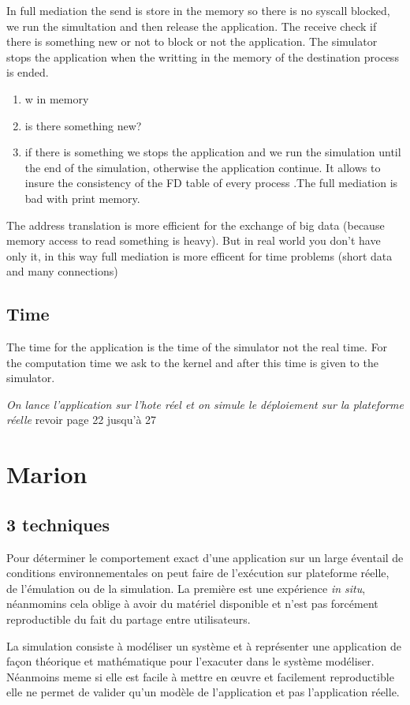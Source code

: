 \documentclass{article}
\begin{document}
In full mediation the send is store in the memory so there is no syscall blocked, we run the simultation and then release the application. The receive check if there is something new or not to block or not the application. The simulator stops the application when the writting in the memory of the destination process is ended.
\begin{enumerate}
\item w in memory
\item is there something new?
\item if there is something we stops the application and we run the simulation until the end of the simulation, otherwise the application continue.
It allows to insure the consistency of the FD table of every process .The full mediation is bad with print memory.
\end{enumerate}

The address translation is more efficient for the exchange of big data (because memory access to read something is heavy). But in real world you don't have only it, in this way full mediation is more efficent for time problems (short data and many connections) 

\subsection{Time}
The time for the application is the time of the simulator not the real time. For the computation time we ask to the kernel and after this time is given to the simulator.

\textit{On lance l'application sur l'hote réel et on simule le déploiement sur la plateforme réelle}
{\color{red} revoir page 22 jusqu'à 27}

\section{Marion}
\subsection{3 techniques}
Pour déterminer le comportement exact d'une application sur un large éventail de
conditions environnementales on peut faire de l'exécution sur plateforme réelle,
de l'émulation ou de la simulation. La première est une expérience \textit{in
  situ}, néanmomins cela oblige à avoir du matériel disponible et n'est pas
forcément reproductible du fait du partage entre utilisateurs.

La simulation consiste à modéliser un système et à représenter une application
de façon théorique et mathématique pour l'exacuter dans le système
modéliser. Néanmoins meme si elle est facile à mettre en \oe uvre et facilement
reproductible elle ne permet de valider qu'un modèle de l'application et pas
l'application réelle.
\end{document}
